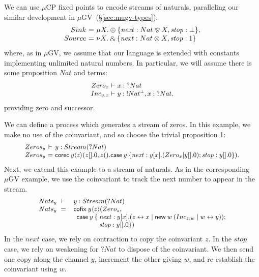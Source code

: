\documentclass[orivec,envcountsame]{llncs}
\makeatletter
\newcommand{\with}{\mathbin\binampersand}
\newcommand{\parr}{\mathbin\bindnasrepma}
\newcommand{\cpdual}[1]{#1^\perp}
\newcommand{\cpbang}[1]{{! #1}}
\newcommand{\cpquery}[1]{{? #1}}
\newcommand{\mkwd}[1]{\mathsf{#1}}
\newcommand{\link}[2]{#1 \leftrightarrow #2}
\newcommand{\cut}[4]{\mkwd{new}\:#1 \: (#3 \mid #4)}
\newcommand{\corec}[5]{\mkwd{corec}\:#1 \langle #2 \rangle (#4,#5)}
\newcommand{\clabel}[1]{\mathit{#1}}
\renewcommand{\case}[2]{\mkwd{case}\:#1\:\{#2\}}
\newcommand{\lrkwd}{\mkwd{cofix}}
\newcommand{\mucp}{$\mu\mathrm{CP}$\xspace}
\newcommand{\mugv}{$\mu\mathrm{GV}$\xspace}
\newcommand{\ba}{\begin{array}}
\newcommand{\ea}{\end{array}}
\newenvironment{equations}{\[\ba{@{}r@{~}c@{~}l@{}}}{\ea\]}
\newenvironment{eqs}{\ba{@{}r@{~}c@{~}l@{}}}{\ea}
\newcommand{\mcl}[2]{\multicolumn{#1}{l}{#2}}
\newcommand{\secref}[1]{(\S\ref{sec:#1})}
\makeatother
\begin{document}
We can use \mucp fixed points to encode streams of naturals, paralleling our similar development in
\mugv~\secref{mugv-types}: %
\begin{equations}
  Sink &=& \mu X. \oplus \{ \clabel{next}: Nat \parr X, \clabel{stop}: \bot \}, \\
  Source &=& \nu X. \with \{ \clabel{next}: Nat \otimes X, \clabel{stop}: 1 \} \\
\end{equations}%
where, as in \mugv, we assume that our language is extended with constants implementing unlimited
natural numbers. In particular, we will assume there is some proposition $Nat$ and terms:
\[\small\begin{eqs}
Zero_x &\vdash& x:\cpquery{Nat} \\
Inc_{y,x} &\vdash& y:\cpbang{\cpdual{Nat}},x:\cpquery{Nat}.
\end{eqs}\]
providing zero and successor.


We can define a process which generates a stream of zeros.  In this example, we make no use of the
coinvariant, and so choose the trivial proposition 1:
\[\small\begin{eqs}
  Zeros_y &\vdash& y:Stream(\cpquery{Nat}) \\
  Zeros_y &=& \corec{y}{z}{1}{z[].0}{z().\case{y}{\clabel{next}: y[x].(Zero_x | y[].0); \clabel{stop}: y[].0}}.
\end{eqs}\]
Next, we extend this example to a stream of naturals.  As in the corresponding \mugv example, we use
the coinvariant to track the next number to appear in the stream.
\[\small\begin{array}{r@{\hspace{2mm}}c@{\hspace{2mm}}l@{\hspace{0mm}}l@{\:}l}
  Nats_y & \vdash & \mcl{3}{y:Stream(\cpquery{Nat})} \\
  Nats_y & = & \mcl{3}{\lrkwd \: y \langle z \rangle (Zero_z,} \\
  & & \quad & \mkwd{case}\:y \:\{ & \clabel{next}: y[x].(\link{z}{x} \mid \cut{w}{}{Inc_{z,w}}{\link{w}{y}}); \\
  & & & & \clabel{stop}: y[].0\})
\end{array}\]
In the $\clabel{next}$ case, we rely on contraction to copy the coinvariant $z$. In the
$\clabel{stop}$ case, we rely on weakening for $\cpquery{Nat}$ to dispose of the coinvariant. We
then send one copy along the channel $y$, increment the other giving $w$, and re-establish the
coinvariant using $w$.
\end{document}
